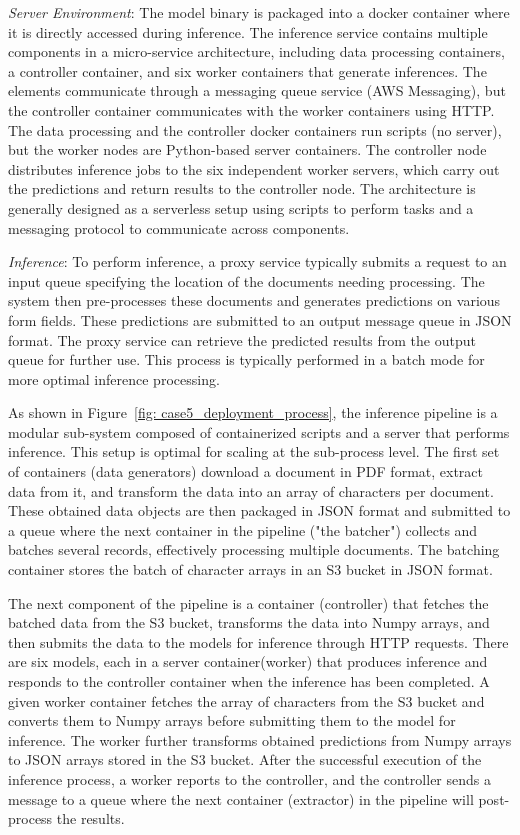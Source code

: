 \textit{Server Environment}: The model binary is packaged into a docker container where it is directly accessed during inference. The inference service contains multiple components in a micro-service architecture, including data processing containers, a controller container, and six worker containers that generate inferences. The elements communicate through a messaging queue service (AWS Messaging), but the controller container communicates with the worker containers using HTTP. The data processing and the controller docker containers run scripts (no server), but the worker nodes are Python-based server containers. The controller node distributes inference jobs to the six independent worker servers, which carry out the predictions and return results to the controller node. The architecture is generally designed as a serverless setup using scripts to perform tasks and a messaging protocol to communicate across components.

\textit{Inference}: To perform inference, a proxy service typically submits a request to an input queue specifying the location of the documents needing processing. The system then pre-processes these documents and generates predictions on various form fields. These predictions are submitted to an output message queue in JSON format. The proxy service can retrieve the predicted results from the output queue for further use. This process is typically performed in a batch mode for more optimal inference processing.

As shown in Figure~\ref{fig: case5_deployment_process}, the inference pipeline is a modular sub-system composed of containerized scripts and a server that performs inference. This setup is optimal for scaling at the sub-process level. The first set of containers (data generators) download a document in PDF format, extract data from it, and transform the data into an array of characters per document. These obtained data objects are then packaged in JSON format and submitted to a queue where the next container in the pipeline ("the batcher") collects and batches several records, effectively processing multiple documents. The batching container stores the batch of character arrays in an S3 bucket in JSON format. 

The next component of the pipeline is a container (controller) that fetches the batched data from the S3 bucket, transforms the data into Numpy arrays, and then submits the data to the models for inference through HTTP requests. There are six models, each in a server container(worker) that produces inference and responds to the controller container when the inference has been completed. A given worker container fetches the array of characters from the S3 bucket and converts them to Numpy arrays before submitting them to the model for inference. The worker further transforms obtained predictions from Numpy arrays to JSON arrays stored in the S3 bucket. After the successful execution of the inference process, a worker reports to the controller, and the controller sends a message to a queue where the next container (extractor) in the pipeline will post-process the results.

